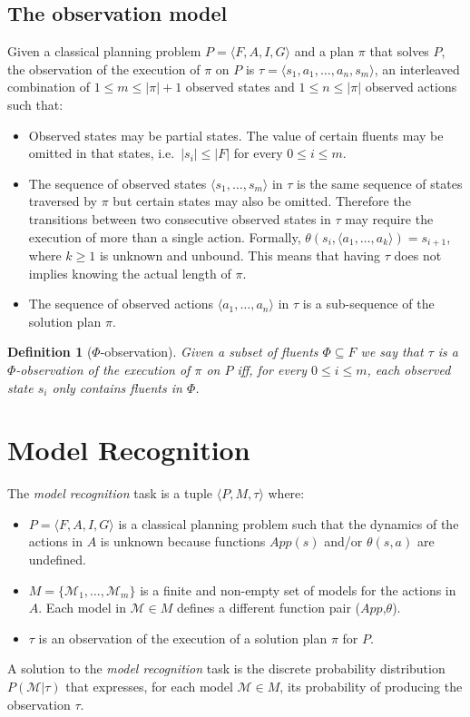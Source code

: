 \documentclass[letterpaper]{article} %
\newcommand{\tup}[1]{{\langle #1 \rangle}}
\newtheorem{definition}[theorem]{Definition}
\begin{document}
\subsection{The observation model}
Given a classical planning problem $P=\tup{F,A,I,G}$ and a plan $\pi$ that solves $P$, the observation of the execution of  $\pi$ on $P$ is $\tau=\tup{s_1, a_1, \ldots , a_n, s_m}$, an interleaved combination of {\small $1\leq m\leq |\pi|+1$} observed states and {\small $1\leq n\leq |\pi|$} observed actions such that:
\begin{itemize}
\item Observed states may be partial states. The value of certain fluents may be omitted in that states, i.e.~$|s_i|\leq |F|$ for every $0\leq i\leq m$.

\item The sequence of observed states $\tup{s_1, \ldots, s_m}$ in $\tau$ is the same sequence of states traversed by $\pi$ but certain states may also be omitted. Therefore the transitions between two consecutive observed states in $\tau$ may require the execution of more than a single action. Formally, $\theta(s_i,\tup{a_1,\ldots,a_k})=s_{i+1}$, where $k\geq 1$ is unknown and unbound. This means that having $\tau$ does not implies knowing the actual length of $\pi$.
\item The sequence of observed actions $\tup{a_1, \ldots, a_n}$ in $\tau$ is a sub-sequence of the solution plan $\pi$.
\end{itemize}

\begin{definition}[$\Phi$-observation]
Given a subset of fluents $\Phi\subseteq F$ we say that $\tau$ is a $\Phi$-observation of the execution of $\pi$ on $P$ iff, for every $0\leq i\leq m$, each observed state $s_i$ only contains fluents in $\Phi$.
\end{definition}



\section{Model Recognition}
\label{sec:recognition}
The {\em model recognition} task is a tuple $\tup{P,M,\tau}$ where:
\begin{itemize}
\item $P=\tup{F,A,I,G}$ is a classical planning problem such that the dynamics of the actions in $A$ is unknown because functions $App(s)$ and/or $\theta(s,a)$ are undefined.
\item $M=\{\mathcal{M}_1,\ldots,\mathcal{M}_m\}$ is a finite and non-empty set of models for the actions in $A$. Each model in $\mathcal{M}\in M$ defines a different function pair ($App$,$\theta$).
\item $\tau$ is an observation of the execution of a solution plan $\pi$ for $P$.
\end{itemize}
A solution to the {\em model recognition} task is the discrete probability distribution $P(\mathcal{M}|\tau)$ that expresses, for each model $\mathcal{M}\in M$, its probability of producing the observation $\tau$.
\end{document}
